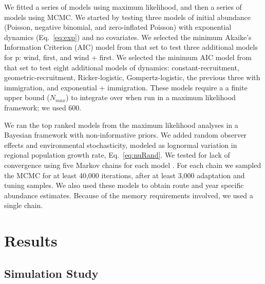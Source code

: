 \documentclass[12pt]{article}
\begin{document}
We fitted a series of models using maximum likelihood, 
and then a series of models using MCMC. We started by testing
three models of initial abundance (Poisson, negative binomial, and
zero-inflated Poisson) with exponential dynamics
(Eq.~\ref{eq:exp}) and no covariates.  We selected the minimum Akaike's Information
Criterion (AIC) model from that set to test three additional
models for p: wind, first, and wind + first. We selected the minimum
AIC model from that set to test eight additional models of dynamics:
constant-recruitment, geometric-recruitment, Ricker-logistic, Gompertz-logistic, 
the previous three with immigration, and exponential + immigration.
These models require a a finite upper bound ($N_{max}$) to integrate
over when run in a maximum likelihood
framework; we used 600. %

We ran the top ranked models from the maximum likelihood
analyses in a Bayesian framework with non-informative priors.  
We added random observer 
effects and environmental stochasticity, modeled as lognormal
variation in regional population growth rate, Eq.~\ref{eq:nuRand}. %
We tested for lack of convergence using
five Markov chains for each model \citep{gelman_rubin:1992}.
For each chain we sampled the MCMC for at least 40,000 iterations, after at
least 3,000 adaptation and tuning samples.  
We also used these models to obtain route and 
year specific abundance estimates.  Because of the memory requirements involved,
we used %
a single chain.  %

\section{Results}

\subsection{Simulation Study}
\end{document}
